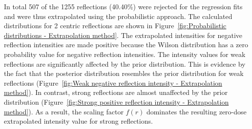 In total 507 of the 1255 reflections (40.40\%) were rejected for the regression fits and were thus extrapolated using the probabilistic approach.
The calculated distributions for 2 centric reflections are shown in Figure~\ref{fig:Probabilistic distributions - Extrapolation method}.
The extrapolated intensities for negative reflection intensities are made positive because the Wilson distribution has a zero probability value for negative reflection intensities.
The intensity values for weak reflections are significantly affected by the prior distribution.
This is evidence by the fact that the posterior distribution resembles the prior distribution for weak reflections (Figure~\ref{fig:Weak negative reflection intensity - Extrapolation method}).
In contrast, strong reflections are almost unaffected by the prior distribution (Figure~\ref{fig:Strong positive reflection intensity - Extrapolation method}).
As a result, the scaling factor $f(r)$ dominates the resulting zero-dose extrapolated intensity value for strong reflections.
